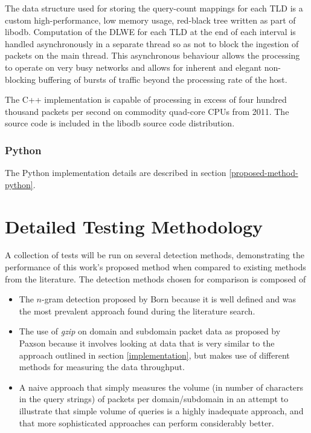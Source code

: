 \documentclass[12pt]{report}
\theoremstyle{remark}
\theoremstyle{definition}
\theoremstyle{definition}
\theoremstyle{definition}
\begin{document}
The data structure used for storing the query-count mappings for each TLD is a
custom high-performance, low memory usage, red-black tree written as part of
libodb\cite{Friesen2013}. Computation of the DLWE for each TLD at the end of
each interval is handled asynchronously in a separate thread so as not to block
the ingestion of packets on the main thread. This asynchronous behaviour allows
the processing to operate on very busy networks and allows for inherent and
elegant non-blocking buffering of bursts of traffic beyond the processing rate
of the host.

The C++ implementation is capable of processing in excess of four hundred
thousand packets per second on commodity quad-core CPUs from 2011. The source
code is included in the libodb source code distribution\cite{Friesen2013}.

\subsection{Python} The Python implementation details are described in section
\ref{proposed-method-python}.

\chapter{Detailed Testing Methodology}
A collection of tests will be run on
several detection methods, demonstrating the performance of this work's proposed
method when compared to existing methods from the literature. The detection
methods chosen for comparison is composed of

\label{chosen-methods}
\begin{itemize}
\item The $n$-gram detection proposed by Born\cite{Born2010.cfa} because it is
well defined and was the most prevalent approach found during the literature
search.

\item The use of \emph{gzip} on domain and subdomain packet data as proposed by
Paxson\cite{Paxson2011} because it involves looking at data that is very similar
to the approach outlined in section \ref{implementation}, but makes use of
different methods for measuring the data throughput.

\item A naive approach that simply measures the volume (in number of characters
in the query strings) of packets per domain/subdomain in an attempt to illustrate that simple
volume of queries is a highly inadequate approach, and that more sophisticated
approaches can perform considerably better.
\end{itemize}
\end{document}
